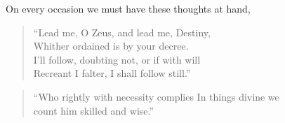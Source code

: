 On every occasion we must have these thoughts at hand,

\begin{quote}
  ``Lead me, O Zeus, and lead me, Destiny, \\
  Whither ordained is by your decree. \\
  I'll follow, doubting not, or if with will \\
  Recreant I falter, I shall follow still.''\footnotemark
\end{quote}

\begin{quote}
  ``Who rightly with necessity complies In things divine we \\
  count him skilled and wise.''\footnotemark
\end{quote}
